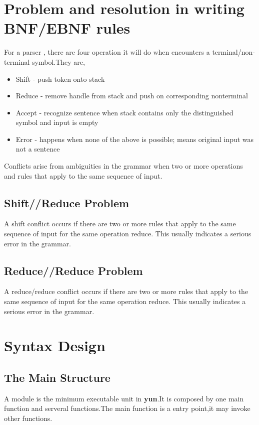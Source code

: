 \section{Problem and resolution in writing BNF/EBNF rules}


For a parser , there are four operation it will do when encounters a terminal/non-terminal symbol.They are,
\begin{itemize}
\item Shift - push token onto stack
\item Reduce - remove handle from stack and push on corresponding nonterminal
\item Accept - recognize sentence when stack contains only the distinguished symbol and input is empty
\item Error - happens when none of the above is possible; means original input was not a sentence
\end{itemize}

Conflicts arise from ambiguities in the grammar when two or more operations and rules that apply to the same sequence of input.\cite{final}
\subsection{Shift//Reduce Problem}
A shift conflict occurs if there are two or more rules that
apply to the same sequence of input for the same operation reduce.  This usually indicates a serious
error in the grammar.

\subsection{Reduce//Reduce Problem}
A reduce/reduce conflict occurs if there are two or more rules that
apply to the same sequence of input for the same operation reduce.  This usually indicates a serious
error in the grammar.


\section{Syntax Design}

\subsection{The Main Structure}
A module is the minimum executable unit in \textbf{yun}.It is composed by one main function and serveral functions.The main function is a entry point,it may invoke other functions.

